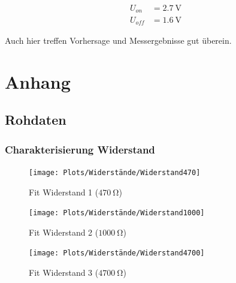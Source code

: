 \documentclass[12pt,twoside,a4paper]{scrartcl}
\begin{document}
			\begin{align}
				U_{on} &= \SI{2.7}{\volt} \\
				U_{off} &= \SI{1.6}{\volt}
			\end{align}

			Auch hier treffen Vorhersage und Messergebnisse gut überein.

\section{Anhang}
	\subsection{Rohdaten}
		\subsubsection{Charakterisierung Widerstand}
		\label{Daten::Widerstand}

			\begin{figure}[H]
				\centering
				\begin{minipage}{0.49 \textwidth}
						\texttt{[image: Plots/Widerstände/Widerstand470]}
				\caption{Fit Widerstand 1 ($\SI{470}{\ohm}$)}
				\end{minipage}
				\begin{minipage}{0.49 \textwidth}
						\texttt{[image: Plots/Widerstände/Widerstand1000]}
				\caption{Fit Widerstand 2 ($\SI{1000}{\ohm}$)}
				\end{minipage}
			\end{figure}

			\begin{figure}[H]
				\centering
				\texttt{[image: Plots/Widerstände/Widerstand4700]}
				\caption{Fit Widerstand 3 ($\SI{4700}{\ohm}$)}
		\end{figure}
\end{document}
